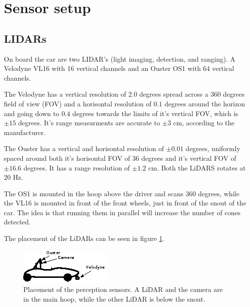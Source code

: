 \section{Sensor setup}
\subsection{LIDARs}

On board the car are two LIDAR's (light imaging, detection, and ranging). A Velodyne VL16 with 16 vertical channels and an Ouster OS1 with 64 vertical channels. 

The Velodyne has a vertical resolution of $2.0$ degrees spread across a $360$ degrees field of view (FOV) and a horisontal resolution of $0.1$ degrees around the horizon and going down to $0.4$ degrees towards the limits of it's vertical FOV, which is $\pm 15$ degrees. It's range measurments are accurate to $\pm 3$ cm, according to the manufacturer. 

The Ouster has a vertical and horisontal resolution of $\pm0.01$ degrees, uniformly spaced around both it's horisontal FOV of $36$ degrees and it's vertical FOV of $\pm 16.6$ degrees. It has a range resolution of $\pm 1.2$ cm. Both the LiDARS rotates at 20 Hz. 

The OS1 is mounted in the hoop above the driver and scans $360$ degrees, while the VL16 is mounted in front of the front wheels, just in front of the snout of the car. The idea is that running them in parallel will increase the number of cones detected. 

The placement of the LiDARs can be seen in figure \ref{Fig:SensorPlacementsV2}.


\begin{figure}
    \centering
    \includegraphics[width=0.8\linewidth]{0_Images/4_Implementation/SensorPlacements.eps}
    \caption[Placement of the perception sensors.]{Placement of the perception sensors. A LiDAR and the camera are in the main hoop, while the other LiDAR is below the snout.}
    \label{Fig:SensorPlacementsV2}
\end{figure}

